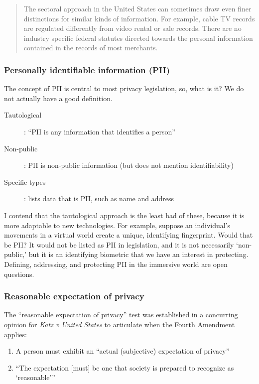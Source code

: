 \begin{quote}
The sectoral approach in the United States can sometimes draw even finer distinctions for similar kinds of information. For example, cable TV records are regulated differently from video rental or sale records. There are no industry specific federal statutes directed towards the personal information contained in the records of most merchants.\cite{solove2018information}
\end{quote} 

\subsubsection{Personally identifiable information (PII)}
The concept of PII is central to most privacy legislation, so, what is it? We do not actually have a good definition.
\begin{description}
	\item[Tautological]: ``PII is any information that identifies a person''
	\item[Non-public]: PII is non-public information (but does not mention identifiability)
	\item[Specific types]: lists data that is PII, such as name and address
\end{description}

I contend that the tautological approach is the least bad of these, because it is more adaptable to new technologies. For example, suppose an individual's movements in a virtual world create a unique, identifying fingerprint. Would that be PII? It would not be listed as PII in legislation, and it is not necessarily `non-public,' but it is an identifying biometric that we have an interest in protecting. Defining, addressing, and protecting PII in the immersive world are open questions.


\subsubsection{Reasonable expectation of privacy}
The ``reasonable expectation of privacy'' test was established in a concurring opinion for \emph{Katz v United States}\cite{katz1967} to articulate when the Fourth Amendment applies:
\begin{enumerate}
	\item A person must exhibit an ``actual (subjective) expectation of privacy''
	\item ``The expectation [must] be one that society is  prepared to recognize as `reasonable'''
\end{enumerate}

